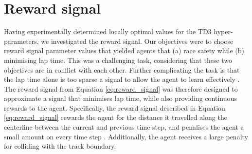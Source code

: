 
\section{Reward signal}

Having experimentally determined locally optimal values for the TD3 hyper-parameters, we investigated the reward signal.
Our objectives were to choose reward signal parameter values that yielded agents that (a) race safety while (b) minimising lap time.
This was a challenging task, considering that these two objectives are in conflict with each other.
Further complicating the task is that the lap time alone is too sparse a signal to allow the agent to learn effectively \cite{Perot2017, Jaritz2018}.
The reward signal from Equation \ref{eq:reward_signal} was therefore designed to approximate a signal that minimises lap time, while also providing continuous rewards to the agent.
Specifically, the reward signal described in Equation \ref{eq:reward_signal} rewards the agent for the distance it travelled along the centerline between the current and previous time step, and penalises the agent a small amount on every time step \cite{Fuchs2021}. 
Additionally, the agent receives a large penalty for colliding with the track boundary. 

